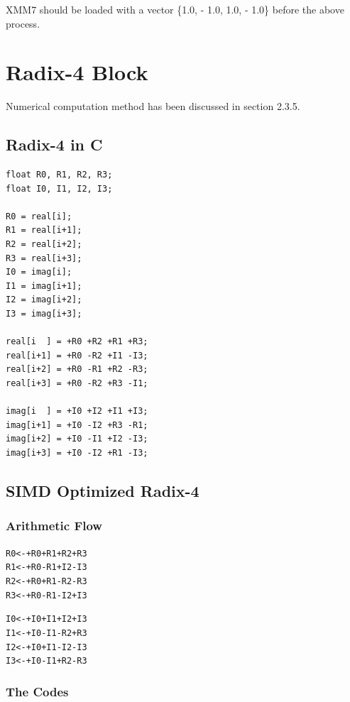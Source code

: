 \documentclass[a4paper]{report}
\begin{document}
    XMM7 should be loaded with a vector \{1.0, - 1.0, 1.0, - 1.0\} before the above process.

\section{Radix-4 Block} \indent

	Numerical computation method has been discussed in section 2.3.5.

\subsection{Radix-4 in C} \indent

    \lstset{language = c, tabsize = 4}
    \begin{lstlisting}
float R0, R1, R2, R3;
float I0, I1, I2, I3;

R0 = real[i];
R1 = real[i+1];
R2 = real[i+2];
R3 = real[i+3];
I0 = imag[i];
I1 = imag[i+1];
I2 = imag[i+2];
I3 = imag[i+3];

real[i  ] = +R0 +R2 +R1 +R3;
real[i+1] = +R0 -R2 +I1 -I3;
real[i+2] = +R0 -R1 +R2 -R3;
real[i+3] = +R0 -R2 +R3 -I1;

imag[i  ] = +I0 +I2 +I1 +I3;
imag[i+1] = +I0 -I2 +R3 -R1;
imag[i+2] = +I0 -I1 +I2 -I3;
imag[i+3] = +I0 -I2 +R1 -I3;
    \end{lstlisting}

\subsection{SIMD Optimized Radix-4} \indent

\subsubsection{Arithmetic Flow} \indent

\begin{alltt}
\centering
R0 <- +R0 +R1 +R2 +R3
R1 <- +R0 -R1 +I2 -I3
R2 <- +R0 +R1 -R2 -R3
R3 <- +R0 -R1 -I2 +I3

I0 <- +I0 +I1 +I2 +I3
I1 <- +I0 -I1 -R2 +R3
I2 <- +I0 +I1 -I2 -I3
I3 <- +I0 -I1 +R2 -R3
\end{alltt}

\subsubsection{The Codes} \indent
\end{document}
